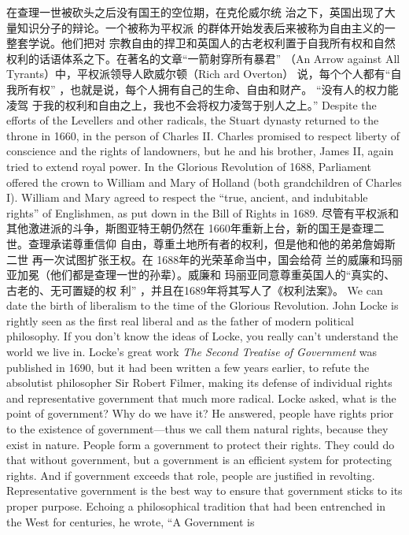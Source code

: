 \begin{paracol}{2}
在查理一世被砍头之后没有国王的空位期，在克伦威尔统
治之下，英国出现了大量知识分子的辩论。一个被称为平权派
的群体开始发表后来被称为自由主义的一整套学说。他们把对
宗教自由的捍卫和英国人的古老权利置于自我所有权和自然权利的话语体系之下。在著名的文章“一箭射穿所有暴君” （An
Arrow against All Tyrants）中，平权派领导人欧威尔顿（Rich­
ard Overton） 说，每个个人都有“自我所有权” ，也就是说，每个人拥有自己的生命、自由和财产。 “没有人的权力能凌驾
于我的权利和自由之上，我也不会将权力凌驾于别人之上。”
\switchcolumn*
Despite the efforts of the Levellers and other radicals, the
Stuart dynasty returned to the throne in 1660, in the person of
Charles II. Charles promised to respect liberty of conscience and
the rights of landowners, but he and his brother, James II, again
tried to extend royal power. In the Glorious Revolution of
1688, Parliament offered the crown to William and Mary of
Holland (both grandchildren of Charles I). William and Mary
agreed to respect the ``true, ancient, and indubitable rights'' of
Englishmen, as put down in the Bill of Rights in 1689.
\switchcolumn
尽管有平权派和其他激进派的斗争，斯图亚特王朝仍然在
1660年重新上台，新的国王是查理二世。查理承诺尊重信仰
自由，尊重土地所有者的权利，但是他和他的弟弟詹姆斯二世
再一次试图扩张王权。在 1688年的光荣革命当中，国会给荷
兰的威廉和玛丽亚加冕（他们都是查理一世的孙辈）。威廉和
玛丽亚同意尊重英国人的“真实的、古老的、无可置疑的权
利” ，并且在1689年将其写人了《权利法案》。
\switchcolumn*
We can date the birth of liberalism to the time of the Glorious Revolution. John Locke is rightly seen as the first real liberal and as the father of modern political philosophy. If you
don't know the ideas of Locke, you really can't understand the
world we live in. Locke's great work \textit{The Second Treatise of Government} was published in 1690, but it had been written a few
years earlier, to refute the absolutist philosopher Sir Robert
Filmer, making its defense of individual rights and representative government that much more radical. Locke asked, what is
the point of government? Why do we have it? He answered, people have rights prior to the existence of government---thus
we call them natural rights, because they exist in nature. People
form a government to protect their rights. They could do that
without government, but a government is an efficient system
for protecting rights. And if government exceeds that role, people are justified in revolting. Representative government is the
best way to ensure that government sticks to its proper purpose. Echoing a philosophical tradition that had been entrenched in the West for centuries, he wrote, ``A Government is

\end{paracol}
